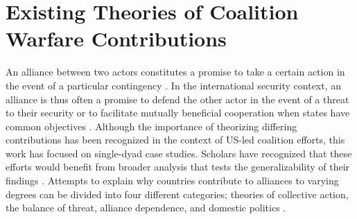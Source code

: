 \documentclass[12pt,letterpaper]{article}
\begin{document}
\section{Existing Theories of Coalition Warfare Contributions}
	An alliance between two actors constitutes a promise to take a certain action in the event of a particular contingency \citep[526]{altfeld_decisionallytheory_1984}. In the international security context, an alliance is thus often a promise to defend the other actor in the event of a threat to their security \citep{waltz_theoryinternationalpolitics_1979, walt_originsalliance_1987} or to facilitate mutually beneficial cooperation when states have common objectives \citep{keohane_hegemonycooperationdiscord_1984, wolford_showingrestraintsignaling_2014}. Although the importance of theorizing differing contributions has been recognized in the context of US-led coalition efforts, this work has focused on single-dyad case studies. Scholars have recognized that these efforts would benefit from broader analysis that tests the generalizability of their findings \citep[4-5]{mello_politicsmultinationalmilitary_2018}. Attempts to explain why countries contribute to alliances to varying degrees can be divided into four different categories; theories of collective action, the balance of threat, alliance dependence, and domestic politics \citep{bennett_burdensharingpersiangulf_1994,haesebrouck_democraticparticipationair_2018}.
	
\end{document}
